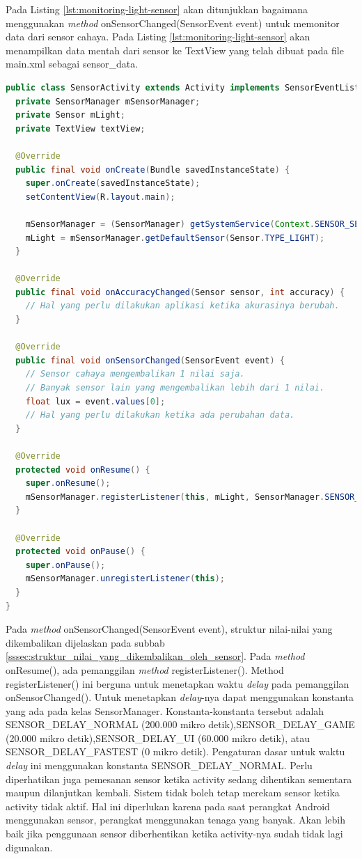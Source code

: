 Pada Listing \ref{lst:monitoring-light-sensor} akan ditunjukkan bagaimana menggunakan \textit{method} onSensorChanged(SensorEvent event) untuk memonitor data dari sensor cahaya. Pada Listing \ref{lst:monitoring-light-sensor} akan menampilkan data mentah dari sensor ke TextView yang telah dibuat pada file main.xml sebagai sensor\_data.
\begin{lstlisting}[caption={Contoh memonitor data mentah pada sensor cahaya},label={lst:monitoring-light-sensor},language=java]
public class SensorActivity extends Activity implements SensorEventListener {
  private SensorManager mSensorManager;
  private Sensor mLight;
  private TextView textView;

  @Override
  public final void onCreate(Bundle savedInstanceState) {
    super.onCreate(savedInstanceState);
    setContentView(R.layout.main);

    mSensorManager = (SensorManager) getSystemService(Context.SENSOR_SERVICE);
    mLight = mSensorManager.getDefaultSensor(Sensor.TYPE_LIGHT);
  }

  @Override
  public final void onAccuracyChanged(Sensor sensor, int accuracy) {
    // Hal yang perlu dilakukan aplikasi ketika akurasinya berubah.
  }

  @Override
  public final void onSensorChanged(SensorEvent event) {
    // Sensor cahaya mengembalikan 1 nilai saja.
    // Banyak sensor lain yang mengembalikan lebih dari 1 nilai.
    float lux = event.values[0];
    // Hal yang perlu dilakukan ketika ada perubahan data.
  }

  @Override
  protected void onResume() {
    super.onResume();
    mSensorManager.registerListener(this, mLight, SensorManager.SENSOR_DELAY_NORMAL);
  }

  @Override
  protected void onPause() {
    super.onPause();
    mSensorManager.unregisterListener(this);
  }
}
\end{lstlisting}
Pada \textit{method} onSensorChanged(SensorEvent event), struktur nilai-nilai yang dikembalikan dijelaskan pada subbab \ref{sssec:struktur_nilai_yang_dikembalikan_oleh_sensor}. Pada \textit{method} onResume(), ada pemanggilan \textit{method} registerListener(). Method registerListener() ini berguna untuk menetapkan waktu \textit{delay} pada pemanggilan onSensorChanged(). Untuk menetapkan \textit{delay}-nya dapat menggunakan konstanta yang ada pada kelas SensorManager. Konstanta-konstanta tersebut adalah SENSOR\_DELAY\_NORMAL (200.000 mikro detik),SENSOR\_DELAY\_GAME (20.000 mikro detik),SENSOR\_DELAY\_UI (60.000 mikro detik), atau SENSOR\_DELAY\_FASTEST (0 mikro detik). Pengaturan dasar untuk waktu \textit{delay} ini menggunakan konstanta SENSOR\_DELAY\_NORMAL.
Perlu diperhatikan juga pemesanan sensor ketika activity sedang dihentikan sementara maupun dilanjutkan kembali. Sistem tidak boleh tetap merekam sensor ketika activity tidak aktif. Hal ini diperlukan karena pada saat perangkat Android menggunakan sensor, perangkat menggunakan tenaga yang banyak. Akan lebih baik jika penggunaan sensor diberhentikan ketika activity-nya sudah tidak lagi digunakan. 
